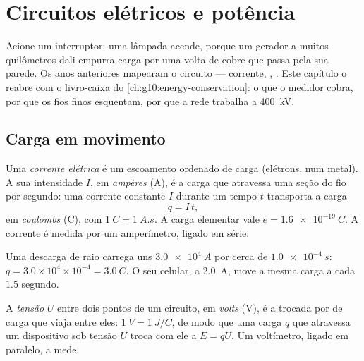 \chapter{Circuitos elétricos e potência}\label{ch:g11:circuits-and-power}

Acione um interruptor: uma lâmpada acende, porque um gerador a muitos
quilômetros dali empurra carga por uma volta de cobre que passa pela sua
parede. Os anos anteriores mapearam o circuito --- corrente, , . Este capítulo o reabre com o livro-caixa do
\cref{ch:g10:energy-conservation}: o que o medidor cobra, por que os fios
finos esquentam, por que a rede trabalha a \qty{400}{kV}.

\section{Carga em movimento}

\begin{definition}\label{def:g11:circuits-and-power:current}
Uma \emph{corrente elétrica} é um escoamento
ordenado de carga (elétrons, num metal). A sua intensidade $I$, em
\emph{ampères} (\unit{A}), é a carga que atravessa uma seção
do fio por segundo: uma corrente constante $I$ durante um tempo $t$
transporta a carga
\[ q = I\,t , \]
em \emph{coulombs} (\unit{C}), com
$\qty{1}{C} = \qty{1}{A.s}$. A carga elementar vale
$e = \qty{1.6e-19}{C}$. A corrente é medida por um amperímetro, ligado em
série.
\end{definition}

\begin{example}\label{ex:g11:circuits-and-power:coulomb}
Uma descarga de raio carrega uns $\qty{3.0e4}{A}$ por cerca de
$\qty{1.0e-4}{s}$: $q = 3.0\times10^{4} \times 10^{-4} = \qty{3.0}{C}$. O
seu celular, a \qty{2.0}{A}, move a mesma carga a cada $1.5$ segundo.
\end{example}

\begin{definition}\label{def:g11:circuits-and-power:voltage}
A \emph{tensão} $U$ entre dois pontos de um circuito, em
\emph{volts} (\unit{V}), é a  trocada por  de
carga que viaja entre eles: $\qty{1}{V} = \qty{1}{J/C}$, de modo que uma
carga $q$ que atravessa um dispositivo sob tensão $U$ troca com ele a
 $E = qU$. Um voltímetro, ligado em paralelo, a mede.
\end{definition}

